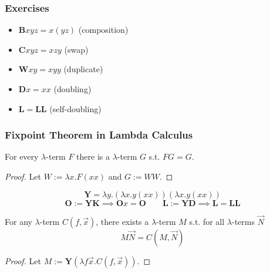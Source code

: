 \documentclass[UTF8,aspectratio=43,11pt,colorlinks,compress,openany]{beamer}%
\begin{document}
\begin{frame}\frametitle{Exercises}
\begin{itemize}
	\item $\mathbf{B}xyz=x(yz)$ (composition)
	\item $\mathbf{C}xyz=xzy$ (swap)
	\item $\mathbf{W}xy=xyy$ (duplicate)
	\item $\mathbf{D}x=xx$ (doubling)
	\item $\mathbf{L}=\mathbf{L}\mathbf{L}$ (self-doubling)
\end{itemize}
\end{frame}

\begin{frame}\frametitle{Fixpoint Theorem in Lambda Calculus}
\setlength\abovedisplayskip{0pt}
\setlength\belowdisplayskip{0pt}
\begin{theorem}
	For every $\lambda$-term $F$ there is a $\lambda$-term $G$ s.t. $FG=G$.
\end{theorem}
\begin{proof}
Let $W:=\lambda x.F(xx)$ and $G:=WW$.
\end{proof}
\[\mathbf{Y}=\lambda y.(\lambda x.y(xx))(\lambda x.y(xx))\]
\[\mathbf{O}:=\mathbf{Y}\mathbf{K}\implies \mathbf{O}x=\mathbf{O}\qquad \mathbf{L}:=\mathbf{Y}\mathbf{D}\implies \mathbf{L}=\mathbf{L}\mathbf{L}\]
\begin{corollary}
For any $\lambda$-term $C(f,\vec{x})$, there exists a $\lambda$-term $M$ s.t. for all $\lambda$-terms $\vec{N}$
\[M\vec{N}=C(M,\vec{N})\]
\end{corollary}
\begin{proof}
Let $M:=\mathbf{Y}(\lambda f\vec{x}.C(f,\vec{x}))$.
\end{proof}
\end{frame}
\end{document}
